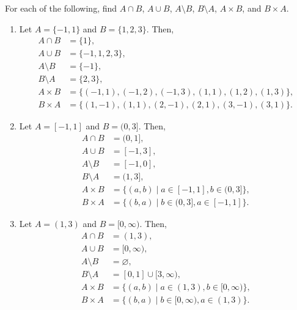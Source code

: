 \begin{exer}
For each of the following, find $ A\cap B $, $ A\cup B $, $ A\setminus B $, $ B\setminus A $, $ A\times B $, and $ B\times A $.

\begin{enumerate}

\item Let $ A=\{-1,1\} $ and $ B=\{1,2,3\} $. Then,
\begin{align*}
    A\cap B &= \{1\}, \\
    A\cup B &= \{-1,1,2,3\}, \\
    A\setminus B &= \{-1\}, \\
    B\setminus A &= \{2,3\}, \\
    A\times B &= \{(-1,1),(-1,2),(-1,3),(1,1),(1,2),(1,3)\}, \\
    B\times A &= \{(1,-1),(1,1),(2,-1),(2,1),(3,-1),(3,1)\}.
\end{align*}

\item Let $ A=[-1,1] $ and $ B=(0,3] $. Then,
\begin{align*}
    A\cap B &= (0,1], \\
    A\cup B &= [-1,3], \\
    A\setminus B &= [-1,0], \\
    B\setminus A &= (1,3], \\
    A\times B &= \{(a,b)\mid a\in[-1,1],b\in (0,3]\}, \\
    B\times A &= \{(b,a)\mid b\in (0,3],a\in [-1,1]\}.
\end{align*}

\item Let $ A=(1,3) $ and $ B=[0,\infty ) $. Then,
\begin{align*}
    A\cap B &= (1,3), \\
    A\cup B &= [0,\infty ), \\
    A\setminus B &= \varnothing, \\
    B\setminus A &= [0,1]\cup [3,\infty ), \\
    A\times B &= \{(a,b)\mid a\in(1,3),b\in [0,\infty )\}, \\
    B\times A &= \{(b,a)\mid b\in [0,\infty ),a\in (1,3)\}.
\end{align*}

\end{enumerate}
\end{exer}

